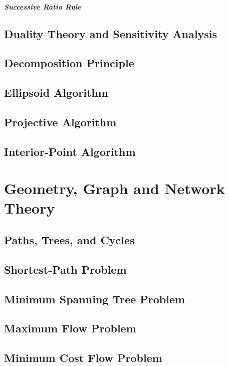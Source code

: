 \documentclass[10pt]{book}
\begin{document}
					\subsubsection{Successive Ratio Rule}

		\chapter{Duality Theory and Sensitivity Analysis}

		\chapter{Decomposition Principle}

		\chapter{Ellipsoid Algorithm}

		\chapter{Projective Algorithm}

		\chapter{Interior-Point Algorithm}

	\part{Geometry, Graph and Network Theory}
		\chapter{Paths, Trees, and Cycles}

		\chapter{Shortest-Path Problem}

		\chapter{Minimum Spanning Tree Problem}

		\chapter{Maximum Flow Problem}

		\chapter{Minimum Cost Flow Problem}
\end{document}
